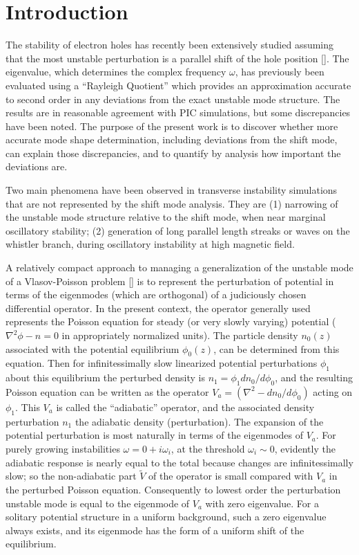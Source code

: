 \documentclass[12pt]{article}
\begin{document}
\section{Introduction}

The stability of electron holes has recently been extensively studied
assuming that the most unstable perturbation is a parallel shift of
the hole position []. The eigenvalue, which determines the complex
frequency $\omega$, has previously been evaluated using a ``Rayleigh
Quotient'' which provides an approximation accurate to second order in
any deviations from the exact unstable mode structure. The results are
in reasonable agreement with PIC simulations, but some discrepancies
have been noted. The purpose of the present work is to discover
whether more accurate mode shape determination, including deviations
from the shift mode, can explain those discrepancies, and to quantify
by analysis how important the deviations are.

Two main phenomena have been observed in transverse instability
simulations that are not represented by the shift mode analysis. They
are (1) narrowing of the unstable mode structure relative to the shift
mode, when near marginal oscillatory stability; (2) generation of long
parallel length streaks or waves on the whistler branch, during
oscillatory instability at high magnetic field.

A relatively compact approach to managing a generalization of the
unstable mode of a Vlasov-Poisson problem [] is to represent the
perturbation of potential in terms of the eigenmodes (which are
orthogonal) of a judiciously chosen differential operator. In the
present context, the operator generally used represents the Poisson
equation for steady (or very slowly varying) potential
($\nabla^2\phi-n=0$ in appropriately normalized units). The particle
density $n_0(z)$ associated with the potential equilibrium
$\phi_0(z)$, can be determined from this equation. Then for
infinitessimally slow linearized potential perturbations $\phi_1$
about this equilibrium the perturbed density is
$n_1=\phi_1dn_0/d\phi_0$, and the resulting Poisson equation can be
written as the operator $V_a =(\nabla^2-dn_0/d\phi_0)$ acting on
$\phi_1$. This $V_a$ is called the ``adiabatic'' operator, and the
associated density perturbation $n_1$ the adiabatic density
(perturbation). The expansion of the potential perturbation is most
naturally in terms of the eigenmodes of $V_a$. For purely growing
instabilities $\omega=0+i\omega_i$, at the threshold $\omega_i\sim 0$,
evidently the adiabatic response is nearly equal to the total because
changes are infinitessimally slow; so the non-adiabatic part
$\tilde V$ of the operator is small compared with $V_a$ in the
perturbed Poisson equation. Consequently to lowest order the
perturbation unstable mode is equal to the eigenmode of $V_a$ with
zero eigenvalue. For a solitary potential structure in a uniform
background, such a zero eigenvalue always exists, and its eigenmode
has the form of a uniform shift of the equilibrium.
\end{document}
